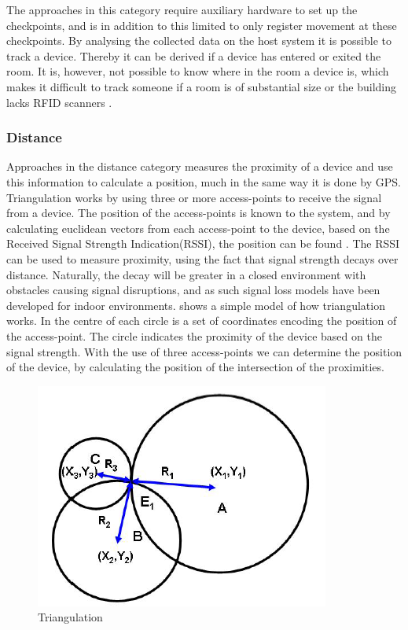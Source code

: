 The approaches in this category require auxiliary hardware to set up the checkpoints, and is in addition to this limited to only register movement at these checkpoints. By analysing the collected data on the host system it is possible to track a device. Thereby it can be derived if a device has entered or exited the room. It is, however, not possible to know where in the room a device is, which makes it difficult to track someone if a room is of substantial size or the building lacks RFID scanners \cite{RFIDjournal}.

\subsubsection*{Distance}
Approaches in the distance category measures the proximity of a device and use this information to calculate a position, much in the same way it is done by GPS.
Triangulation works by using three or more access-points to receive the signal from a device. The position of the access-points is known to the system, and by calculating euclidean vectors from each access-point to the device, based on the Received Signal Strength Indication(RSSI), the position can be found \cite{Triangulation}. The RSSI can be used to measure proximity, using the fact that signal strength decays over distance. Naturally, the decay will be greater in a closed environment with obstacles causing signal disruptions, and as such signal loss models have been developed for indoor environments. 
 shows a simple model of how triangulation works. In the centre of each circle is a set of coordinates encoding the position of the access-point. The circle indicates the proximity of the device based on the signal strength. With the use of three access-points we can determine the position of the device, by calculating the position of the intersection of the proximities.
\begin{figure}[ht]
	\begin{center}
		\includegraphics[scale=1]{graphics/triangulation.png}
		\caption{Triangulation \cite{Triangulation}}
		\label{fig:triangulation}
	\end{center}
\end{figure}

